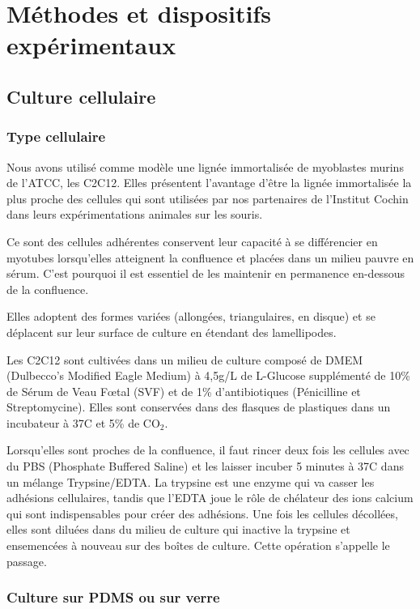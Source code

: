 \documentclass{report}
\begin{document}
\chapter{Méthodes et dispositifs expérimentaux}

\section{Culture cellulaire}
	\subsection{Type cellulaire}
	
	Nous avons utilisé comme modèle une lignée immortalisée de myoblastes murins de l'ATCC, les C2C12. Elles présentent l'avantage d'être la lignée immortalisée la plus proche des cellules qui sont utilisées par nos partenaires de l'Institut Cochin dans leurs expérimentations animales sur les souris. 
	
	Ce sont des cellules adhérentes conservent leur capacité à se différencier en myotubes lorsqu'elles atteignent la confluence et placées dans un milieu pauvre en sérum. C'est pourquoi il est essentiel de les maintenir en permanence en-dessous de la confluence. 
	
	Elles adoptent des formes variées (allongées, triangulaires, en disque) et se déplacent sur leur surface de culture en étendant des lamellipodes. 
	
	Les C2C12 sont cultivées dans un milieu de culture composé de DMEM (Dulbecco's Modified Eagle Medium) à 4,5g/L de L-Glucose supplémenté de 10\% de Sérum de Veau F\oe tal (SVF) et de 1\% d'antibiotiques (Pénicilline et Streptomycine). Elles sont conservées dans des flasques de plastiques dans un incubateur à 37\degres   C et 5\% de CO$_2$. 
	
	
	Lorsqu'elles sont proches de la confluence, il faut rincer deux fois les cellules avec du PBS (Phosphate Buffered Saline) et les laisser incuber 5 minutes à 37\degres   C dans un mélange Trypsine/EDTA. La trypsine est une enzyme qui va casser les adhésions cellulaires, tandis que l'EDTA joue le rôle de chélateur des ions calcium qui sont indispensables pour créer des adhésions. Une fois les cellules décollées, elles sont diluées dans du milieu de culture qui inactive la trypsine et ensemencées à nouveau sur des boîtes de culture. Cette opération s'appelle le passage. 
	 
	\subsection{Culture sur PDMS ou sur verre}
\end{document}
